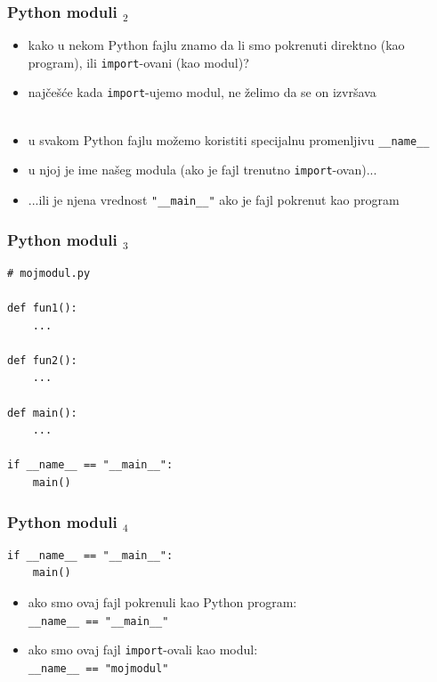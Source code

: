 \documentclass[utf8,compress,aspectratio=169]{beamer}
\begin{document}
\begin{frame}[fragile]
  \frametitle{Python moduli $_2$}
  \begin{itemize}
    \item kako u nekom Python fajlu znamo da li smo pokrenuti direktno (kao program), ili \texttt{import}-ovani (kao modul)?
    \item najčešće kada \texttt{import}-ujemo modul, ne želimo da se on izvršava \\ \ \\
    \item u svakom Python fajlu možemo koristiti specijalnu promenljivu \texttt{\_\_name\_\_}
    \item u njoj je ime našeg modula (ako je fajl trenutno \texttt{import}-ovan)...
    \item ...ili je njena vrednost \texttt{"\_\_main\_\_"} ako je fajl pokrenut kao program
  \end{itemize}
\end{frame}

\begin{frame}[fragile]
  \frametitle{Python moduli $_3$}
\begin{verbatim}
# mojmodul.py

def fun1():
    ...

def fun2():
    ...

def main():
    ...

if __name__ == "__main__":
    main()
\end{verbatim}
\end{frame}

\begin{frame}[fragile]
  \frametitle{Python moduli $_4$}
\begin{verbatim}
if __name__ == "__main__":
    main()
\end{verbatim}
  \begin{itemize}
    \item ako smo ovaj fajl pokrenuli kao Python program: \\
    \texttt{\_\_name\_\_ == "\_\_main\_\_"}
    \item ako smo ovaj fajl \texttt{import}-ovali kao modul: \\
    \texttt{\_\_name\_\_ == "mojmodul"}
  \end{itemize}
\end{frame}
\end{document}
